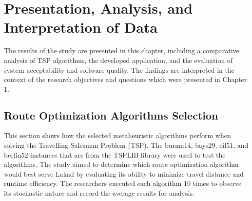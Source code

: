 \chapter{Presentation, Analysis, and Interpretation of Data}
\thispagestyle{empty}

The results of the study are presented in this chapter, including a comparative analysis of TSP algorithms, the developed application, and the evaluation of system acceptability and software quality. The findings are interpreted in the context of the research objectives and questions which were presented in Chapter 1.

\section{Route Optimization Algorithms Selection}
This section shows how the selected metaheuristic algorithms perform when solving the Travelling Salesman Problem (TSP). The burma14, bays29, eil51, and berlin52 instances that are from the TSPLIB library were used to test the algorithms. The study aimed to determine which route optimization algorithm would best serve Lakad by evaluating its ability to minimize travel distance and runtime efficiency. The researchers executed each algorithm 10 times to observe its stochastic nature and record the average results for analysis.

